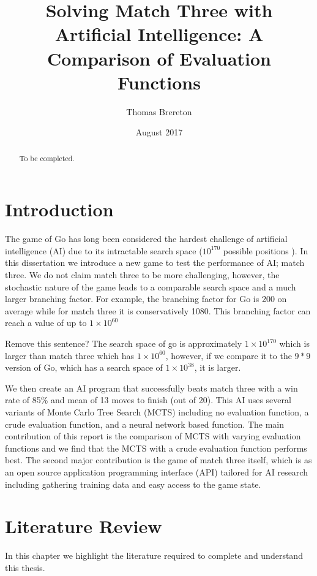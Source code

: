 \documentclass{bhamthesis}
\title{Solving Match Three with Artificial Intelligence: A Comparison of Evaluation Functions}
\author{Thomas Brereton}
\date{August 2017}  %
\makeatletter
\theoremstyle{definition}
\newcommand{\makecrestcover}{%
\begin{titlepage}
\centering\singlespacing
\vspace*{1cm}
{\huge\bfseries University of Birmingham\par}
\vspace*{2cm}
\texttt{[image: crest]}\par
\vspace*{\stretch{1}}
{\Huge\bfseries
\@author\par
\vspace{1cm}
\@title\par}
\vspace*{\stretch{1}}
{\Large\@date\par}
\end{titlepage}
}
\makeatother
\begin{document}
\frontmatter

\maketitle


\begin{abstract}
To be completed.
\end{abstract}

\tableofcontents
\mainmatter


\clearpage
\printglossaries

\chapter{Introduction}
The game of Go has long been considered the hardest challenge of artificial intelligence (AI) due to its intractable search space ($10^{170}$ possible positions \cite{Gelly2012}). In this dissertation we introduce a new game to test the performance of AI; match three. We do not claim match three to be more challenging, however, the stochastic nature of the game leads to a comparable search space and a much larger branching factor. For example, the branching factor for Go is 200 on average \cite{Gelly2012} while for match three it is conservatively 1080. This branching factor can reach a value of up to $1 \times 10^{60}$ 

Remove this sentence?
The search space of go is approximately $1 \times 10^{170}$ which is larger than match three which has $1 \times 10^{60}$, however, if we compare it to the $9*9$ version of Go, which has a search space of $1 \times 10^{38}$, it is larger.

We then create an AI program that successfully beats match three with a win rate of 85\% and mean of 13 moves to finish (out of 20). This AI uses several variants of Monte Carlo Tree Search (MCTS) including no evaluation function, a crude evaluation function, and a neural network based function. The main contribution of this report is the comparison of MCTS with varying evaluation functions and we find that the MCTS with a crude evaluation function performs best. The second major contribution is the game of match three itself, which is as an open source application programming interface (API) tailored for AI research including gathering training data and easy access to the game state.

\chapter{Literature Review}
In this chapter we highlight the literature required to complete and understand this thesis.
\end{document}
